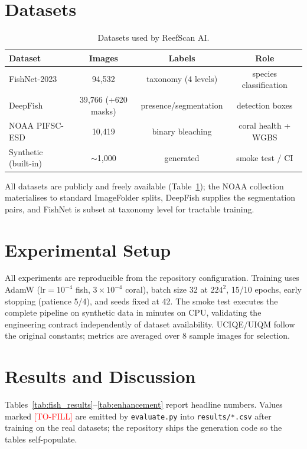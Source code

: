 \documentclass[conference]{IEEEtran}
\newcommand{\tofill}[1]{\textcolor{red}{[#1]}}
\begin{document}
\section{Datasets}
\begin{table}[t]
\centering
\caption{Datasets used by ReefScan AI.}
\label{tab:datasets}
\begin{tabular}{lccc}
\toprule
Dataset & Images & Labels & Role \\
\midrule
FishNet-2023 \cite{khan2023fishnet} & 94{,}532 & taxonomy (4 levels) & species classification \\
DeepFish \cite{saleh2020deepfish} & 39{,}766 (+620 masks) & presence/segmentation & detection boxes \\
NOAA PIFSC-ESD \cite{noaa2024coral} & 10{,}419 & binary bleaching & coral health + WGBS \\
Synthetic (built-in) & $\sim$1{,}000 & generated & smoke test / CI \\
\bottomrule
\end{tabular}
\end{table}
All datasets are publicly and freely available (Table~\ref{tab:datasets}); the NOAA collection materialises to standard ImageFolder splits, DeepFish supplies the segmentation pairs, and FishNet is subset at taxonomy level for tractable training.

\section{Experimental Setup}
All experiments are reproducible from the repository configuration. Training uses AdamW ($\mathrm{lr}{=}10^{-4}$ fish, $3{\times}10^{-4}$ coral), batch size 32 at $224^2$, 15/10 epochs, early stopping (patience 5/4), and seeds fixed at 42. The smoke test executes the complete pipeline on synthetic data in minutes on CPU, validating the engineering contract independently of dataset availability. UCIQE/UIQM follow the original constants; metrics are averaged over 8 sample images for selection.

\section{Results and Discussion}
\label{sec:results}
Tables~\ref{tab:fish_results}--\ref{tab:enhancement} report headline numbers. Values marked \tofill{TO-FILL} are emitted by \texttt{evaluate.py} into \texttt{results/*.csv} after training on the real datasets; the repository ships the generation code so the tables self-populate.
\end{document}
